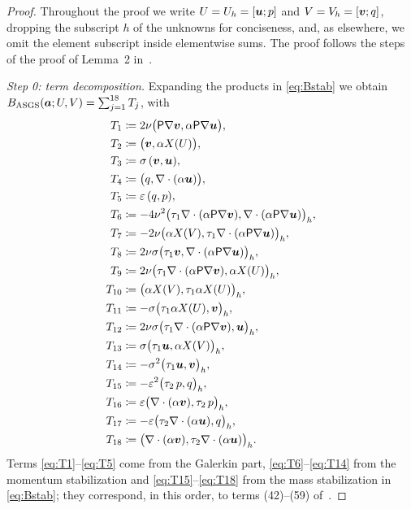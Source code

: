 \begin{proof}
Throughout the proof we write $U=U_h=[\boldsymbol{u};p]$ and $V=V_h=[\boldsymbol{v};q]$, dropping the subscript
$h$ of the unknowns for conciseness, and, as elsewhere, we omit the element subscript inside
elementwise sums. The proof follows the steps of the proof of Lemma~2
in~\cite{codina2001stabilized}.

\medskip\noindent\emph{Step 0: term decomposition.}
Expanding the products in \eqref{eq:Bstab} we obtain
$B_{\mathrm{ASGS}} (\boldsymbol{a};U,V) = \sum_{j=1}^{18} T_j$, with
\begin{align}
  T_1 &\coloneqq 2\nu\bigl(\mathsf{P}\nabla\boldsymbol{v},\alpha\mathsf{P}\nabla\boldsymbol{u}\bigr), \label{eq:T1}\\
  T_2 &\coloneqq \bigl(\boldsymbol{v},\alpha X(U)\bigr), \label{eq:T2}\\
  T_3 &\coloneqq \sigma\,(\boldsymbol{v},\boldsymbol{u}), \label{eq:T3}\\
  T_4 &\coloneqq \bigl(q,\nabla\cdot(\alpha\boldsymbol{u})\bigr), \label{eq:T4}\\
  T_5 &\coloneqq \varepsilon\,(q,p), \label{eq:T5}\\
  T_6 &\coloneqq -4\nu^2\bigl(\tau_1\nabla\cdot(\alpha\mathsf{P}\nabla\boldsymbol{v}),
        \nabla\cdot(\alpha\mathsf{P}\nabla\boldsymbol{u})\bigr)_h, \label{eq:T6}\\
  T_7 &\coloneqq -2\nu\bigl(\alpha X(V),
        \tau_1\nabla\cdot(\alpha\mathsf{P}\nabla\boldsymbol{u})\bigr)_h, \label{eq:T7}\\
  T_8 &\coloneqq 2\nu\sigma\bigl(\tau_1\boldsymbol{v},
        \nabla\cdot(\alpha\mathsf{P}\nabla\boldsymbol{u})\bigr)_h, \label{eq:T8}\\
  T_9 &\coloneqq 2\nu\bigl(\tau_1\nabla\cdot(\alpha\mathsf{P}\nabla\boldsymbol{v}),
        \alpha X(U)\bigr)_h, \label{eq:T9}\\
  T_{10} &\coloneqq \bigl(\alpha X(V),\tau_1\alpha X(U)\bigr)_h, \label{eq:T10}\\
  T_{11} &\coloneqq -\sigma\bigl(\tau_1\alpha X(U),\boldsymbol{v}\bigr)_h, \label{eq:T11}\\
  T_{12} &\coloneqq 2\nu\sigma\bigl(\tau_1\nabla\cdot(\alpha\mathsf{P}\nabla\boldsymbol{v}),
        \boldsymbol{u}\bigr)_h, \label{eq:T12}\\
  T_{13} &\coloneqq \sigma\bigl(\tau_1\boldsymbol{u},\alpha X(V)\bigr)_h, \label{eq:T13}\\
  T_{14} &\coloneqq -\sigma^2\bigl(\tau_1\boldsymbol{u},\boldsymbol{v}\bigr)_h, \label{eq:T14}\\
  T_{15} &\coloneqq -\varepsilon^2\bigl(\tau_2\,p,q\bigr)_h, \label{eq:T15}\\
  T_{16} &\coloneqq \varepsilon\bigl(\nabla\cdot(\alpha\boldsymbol{v}),\tau_2\,p\bigr)_h, \label{eq:T16}\\
  T_{17} &\coloneqq -\varepsilon\bigl(\tau_2\nabla\cdot(\alpha\boldsymbol{u}),q\bigr)_h, \label{eq:T17}\\
  T_{18} &\coloneqq \bigl(\nabla\cdot(\alpha\boldsymbol{v}),\tau_2\nabla\cdot(\alpha\boldsymbol{u})\bigr)_h .
        \label{eq:T18}
\end{align}
Terms \eqref{eq:T1}--\eqref{eq:T5} come from the Galerkin part,
\eqref{eq:T6}--\eqref{eq:T14} from the momentum stabilization and
\eqref{eq:T15}--\eqref{eq:T18} from the mass stabilization in \eqref{eq:Bstab}; they
correspond, in this order, to terms (42)--(59) of~\cite{codina2001stabilized}.


\end{proof}

